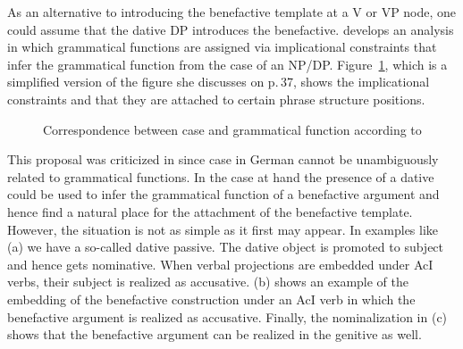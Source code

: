 \label{sec-gf-introduced-by-case}%
As an alternative to introducing the benefactive template at a V or VP node, one could assume that the
dative DP introduces the benefactive. \citet{Berman2003a} develops an analysis in which grammatical functions are assigned via
implicational constraints that infer the grammatical function from the case of an NP/DP. 
Figure~\ref{fig-case-gf-berman}, which is a simplified version of the figure she discusses on
p.\,37, shows the implicational constraints and that they are attached to certain phrase structure positions.
\begin{figure}
{}
\caption{Correspondence between case and grammatical function according to \citet[]{Berman2003a}}\label{fig-case-gf-berman}
\end{figure}%
This proposal was criticized in \citet[Section~7.4]{MuellerGT-Eng1} since case in German cannot be unambiguously related to
grammatical functions. In the case at hand the presence of a dative could be used to infer the
grammatical function of a benefactive argument and hence find a natural place for the attachment of
the benefactive template. However, the situation is not as simple as it first
may appear. In examples like (a) we have a so-called dative passive. The dative object is
promoted to subject and hence gets nominative. When verbal projections are embedded under AcI verbs,
their subject is realized as accusative. (b) shows an example of the embedding of the
benefactive construction under an AcI verb in which the benefactive argument is realized as
accusative. Finally, the nominalization in (c) shows that the benefactive argument can be
realized in the genitive as well.
\eal
\label{ex-benefactive-in-differentcases}
